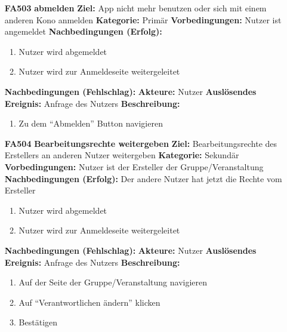 \documentclass[parskip=full]{scrartcl}
\begin{document}
\begin{itemize}[nosep]
			\item[\textbf{FA503}]\textbf{abmelden}
			\newline \textbf{Ziel:} \gls{App} nicht mehr benutzen oder sich mit einem anderen Kono anmelden
			\newline \textbf{Kategorie:} Primär
			\newline \textbf{Vorbedingungen:} Nutzer ist angemeldet
			\newline \textbf{Nachbedingungen (Erfolg):} 
			\begin{enumerate}[nosep]
				\item Nutzer wird abgemeldet
				\item Nutzer wird zur Anmeldeseite weitergeleitet 
			\end{enumerate}
			\textbf{Nachbedingungen (Fehlschlag):}
			\newline \textbf{Akteure:} Nutzer
			\newline \textbf{Auslösendes Ereignis:} Anfrage des Nutzers
			\newline \textbf{Beschreibung:}
			\begin{enumerate}[nosep]
				\item Zu dem “Abmelden” \gls{Button} navigieren\\
			\end{enumerate}
			
		
			\item[\textbf{FA504}]\textbf{Bearbeitungsrechte weitergeben} \label{sec:FA504}
			\newline \textbf{Ziel:} Bearbeitungsrechte des Erstellers an anderen Nutzer weitergeben
			\newline \textbf{Kategorie:} Sekundär
			\newline \textbf{Vorbedingungen:} Nutzer ist der Ersteller der Gruppe/Veranstaltung
			\newline \textbf{Nachbedingungen (Erfolg):} Der andere Nutzer hat jetzt die Rechte vom Ersteller
			\begin{enumerate}[nosep]
				\item Nutzer wird abgemeldet
				\item Nutzer wird zur Anmeldeseite weitergeleitet 
			\end{enumerate}
			\textbf{Nachbedingungen (Fehlschlag):}
			\newline \textbf{Akteure:} Nutzer
			\newline \textbf{Auslösendes Ereignis:} Anfrage des Nutzers
			\newline \textbf{Beschreibung:}
			\begin{enumerate}[nosep]
				\item Auf der Seite der Gruppe/Veranstaltung navigieren\\
				\item Auf “Verantwortlichen ändern” klicken
				\item Bestätigen
			\end{enumerate}
			
		\end{itemize}
		
\end{document}
